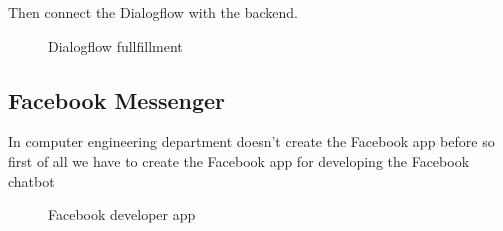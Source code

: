 \documentclass[12pt,oneside,openright,a4paper]{cpe-english-project}
\begin{document}
		\begin{flushleft}
			Then connect the Dialogflow with the backend.
		\end{flushleft}
		\begin{figure}[!h]\centering
			\caption{Dialogflow fullfillment}\label{fig:Dialogflow fullfillment}
		\end{figure}
\pagebreak
	\subsection{Facebook Messenger}
		\begin{flushleft}
			In computer engineering department doesn't create the Facebook app before so first of all we have to create the Facebook app for developing the Facebook chatbot
		\end{flushleft}
		\begin{figure}[!h]\centering
			\caption{Facebook developer app}\label{fig:facebook developer app}
		\end{figure}
\end{document}
